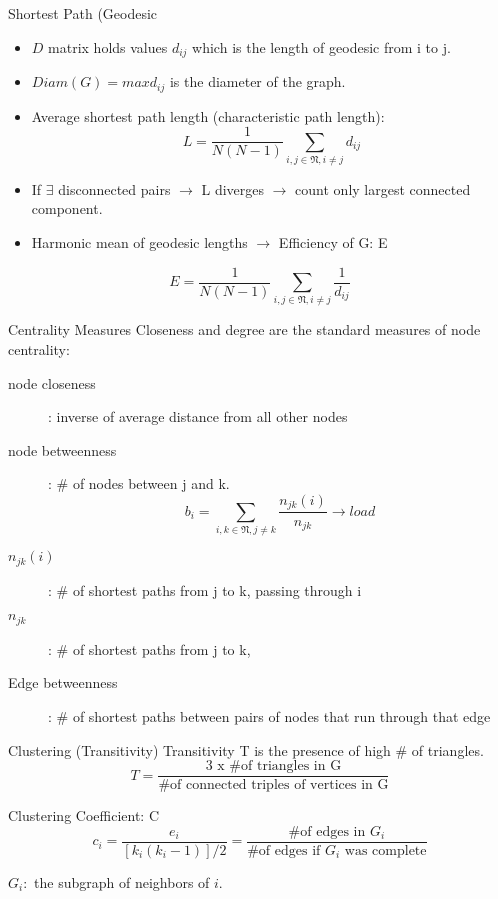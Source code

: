 \documentclass{beamer}
\begin{document}

\begin{frame}{Shortest Path (Geodesic}

\begin{itemize}
 \item $D$ matrix holds values $d_{ij}$ which is the length of geodesic from i to j.
 \item $Diam(G) = max{d_{ij}}$ is the diameter of the graph.
 \item Average shortest path length (characteristic path length):
\[ L = \frac{1}{N(N-1)} \sum_{i,j\in\mathfrak{N}, {i\neq j}}d_{ij} \]
 \item If $\exists$ disconnected pairs $\rightarrow$ L diverges $\rightarrow$ count only largest connected component.
 \item Harmonic mean of geodesic lengths $\rightarrow$ Efficiency of G: E
\end{itemize}
\[E = \frac{1}{N(N-1)} \sum_{i,j\in\mathfrak{N}, {i\neq j}} \frac{1}{d_{ij}} \]

\end{frame}


\begin{frame}{Centrality Measures}
Closeness and degree are the standard measures of node centrality:
\begin{description}
 \item [node closeness]: inverse of average distance from all other nodes  
 \item [node betweenness]: \# of nodes between j and k.
\[ b_i = \sum_{i,k \in \mathfrak{N}, {j \neq k}} \frac{ n_{jk} (i) } {n_{jk}} \rightarrow load\]
\item[$n_{jk}(i)$]: \# of shortest paths from j to k, passing through i
\item[$n_{jk}$]: \# of shortest paths from j to k,\\
\item[Edge betweenness]: \# of shortest paths between pairs of nodes that run through that edge
\end{description}



\end{frame}


\begin{frame}{Clustering (Transitivity)}
Transitivity T is the presence of high \# of triangles.
\[ T = \frac{ 3 \text{ x \# of triangles in G} } {\text{\# of connected triples of vertices in G}} \]

Clustering Coefficient: C
\[c_i = \frac{e_i}{[ k_i (k_i - 1) ] / 2} = \frac{\text{\# of edges in } G_i}{\text{\# of edges if $G_i$ was complete}}
\]

$G_i:$ the subgraph of neighbors of $i$.

\end{frame}
\end{document}
